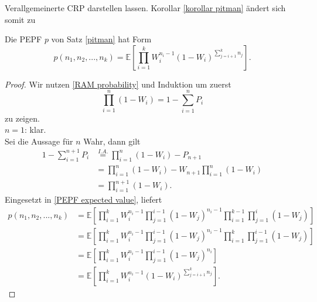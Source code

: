 \begin{section}{Verallgemeinerte CRP}
darstellen lassen. Korollar \ref{korollar pitman} ändert sich somit zu
\begin{Korollar}
    Die PEPF $p$ von Satz \ref{pitman} hat Form
    \[
    p(n_1,n_2,...,n_k) = \mathbb{E}\left[\prod_{i=1}^{k}W_i^{n_i-1}(1-W_i)^{\sum_{j=i+1}^{k}n_j}\right].
    \]
\end{Korollar}
\begin{proof}
   Wir nutzen \ref{RAM probability} und Induktion um zuerst
   \[
    \prod_{i=1}^{n}(1-W_i) = 1 - \sum_{i=1}^{n}P_i
   \] 
   zu zeigen.\\
   $n = 1$: klar. \\
   Sei die Aussage für $n$ Wahr, dann gilt 
   \begin{align*}
    1 - \sum_{i=1}^{n+1}P_i &\overset{I.A.}{=} \prod_{i=1}^{n}(1-W_i) - P_{n+1}\\
    &=  \prod_{i=1}^{n}(1-W_i) - W_{n+1}\prod_{i=1}^{n}(1-W_i) \\
    &= \prod_{i=1}^{n+1}(1-W_i).
   \end{align*}
   Eingesetzt in \ref{PEPF expected value}, liefert 
   \begin{align*}
    p(n_1,n_2,...,n_k) &= \mathbb{E}\left[\prod_{i=1}^{k}W_i^{n_i-1}\prod_{j=1}^{i-1}(1-W_j)^{n_i-1}\prod_{i=1}^{k-1}\prod_{j=1}^{i}(1-W_j)\right]\\
    &= \mathbb{E}\left[\prod_{i=1}^{k}W_i^{n_i-1}\prod_{j=1}^{i-1}(1-W_j)^{n_i-1}\prod_{i=1}^{k}\prod_{j=1}^{i-1}(1-W_j)\right]\\
    &= \mathbb{E}\left[\prod_{i=1}^{k}W_i^{n_i-1}\prod_{j=1}^{i-1}(1-W_j)^{n_i}\right]\\
    &=\mathbb{E}\left[\prod_{i=1}^{k}W_i^{n_i-1}(1-W_i)^{\sum_{j=i+1}^{k}n_j}\right].
   \end{align*}  

\end{proof}


\end{section}
